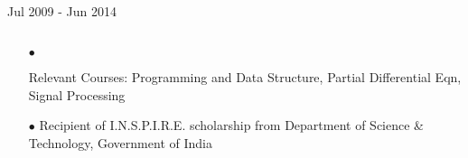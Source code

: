 \documentclass[a4paper, 10pt, oneside]{article}
\newcommand{\bulltetspace}{\vspace{-0.2em}}
\begin{document}
\begin{center}
 \hfill {Jul 2009 - Jun 2014}\\
\color{text1}{Bachelors (Honors) \& Masters (Honors) of Science in Geophysics} \hfill\\%
\begin{itemize}
\vspace{-0.7em}
\item[$\bullet$] \raggedright{Relevant Courses:} Programming and Data Structure, Partial Differential Eqn, Signal Processing\\%
 \bulltetspace
\item[$\bullet$] Recipient of I.N.S.P.I.R.E. scholarship from Department of Science \& Technology, Government of India\\
\vspace{-1.2 em}
\end{itemize}
\end{center}
\end{document}
